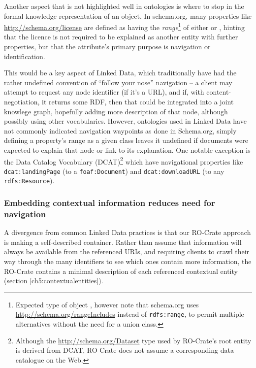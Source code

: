Another aspect that is not highlighted well in ontologies is where to stop in the formal knowledge representation of an object.
In schema.org, many properties like \url{http://schema.org/license} are defined as having the \emph{range}\footnote{Expected type of object \cite{w3-rdf-schema}, however note that schema.org uses \url{http://schema.org/rangeIncludes} instead of \texttt{rdfs:range}, to permit multiple alternatives without the need for a union class.} of either  or , hinting that the licence is not required to be explained as another entity with further properties, but that the attribute's primary purpose is navigation or identification. 

This would be a key aspect of Linked Data, which traditionally have had the rather undefined convention of ``follow your nose'' navigation -- a client may attempt to request any node identifier (if it's a URL), and if, with content-negotiation, it returns some RDF, then that could be integrated into a joint knowlege graph, hopefully adding more description of that node, although possibly using other vocabularies.
However, ontologies used in Linked Data have not commonly indicated navigation waypoints as done in Schema.org, simply defining a property's range as a given class leaves it undefined if documents were expected to explain that node or link to its explanation. One notable exception is the Data Catalog Vocabulary (DCAT)\footnote{Although the \url{http://schema.org/Dataset} type used by RO-Crate's root entity is derived from DCAT, RO-Crate does not assume a corresponding data catalogue on the Web.} \cite{DCAT2 2020} which have navigational properties like \texttt{dcat:landingPage} (to a \texttt{foaf:Document}) and \texttt{dcat:downloadURL} (to any \texttt{rdfs:Resource}).


\subsubsection{Embedding contextual information reduces need for navigation}
\label{ch61:contextual}

A divergence from common Linked Data practices is that our RO-Crate approach is making a self-described container.
Rather than assume that information will always be available from the referenced URIs, and requiring clients to crawl their way through the many identifiers to see which ones contain more information, the RO-Crate contains a minimal description of each referenced contextual entity (section \vref{ch5:contextualentities}). 

